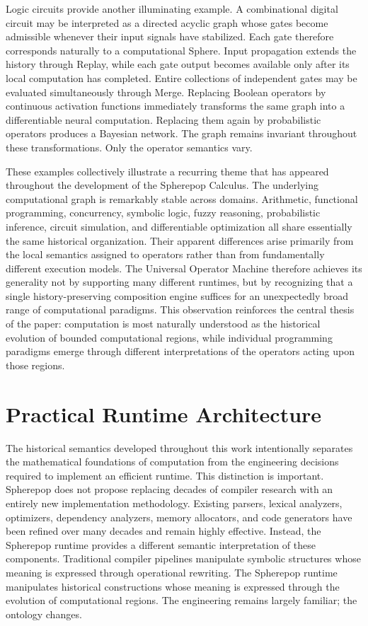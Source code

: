 \documentclass[12pt,oneside]{article}
\theoremstyle{definition}
\theoremstyle{remark}
\begin{document}
Logic circuits provide another illuminating example. A combinational digital
circuit may be interpreted as a directed acyclic graph whose gates become
admissible whenever their input signals have stabilized. Each gate therefore
corresponds naturally to a computational Sphere. Input propagation extends the
history through Replay, while each gate output becomes available only after
its local computation has completed. Entire collections of independent gates
may be evaluated simultaneously through Merge. Replacing Boolean operators by
continuous activation functions immediately transforms the same graph into a
differentiable neural computation. Replacing them again by probabilistic
operators produces a Bayesian network. The graph remains invariant throughout
these transformations. Only the operator semantics vary.

These examples collectively illustrate a recurring theme that has appeared
throughout the development of the Spherepop Calculus. The underlying
computational graph is remarkably stable across domains. Arithmetic,
functional programming, concurrency, symbolic logic, fuzzy reasoning,
probabilistic inference, circuit simulation, and differentiable optimization
all share essentially the same historical organization. Their apparent
differences arise primarily from the local semantics assigned to operators
rather than from fundamentally different execution models. The Universal
Operator Machine therefore achieves its generality not by supporting many
different runtimes, but by recognizing that a single history-preserving
composition engine suffices for an unexpectedly broad range of computational
paradigms. This observation reinforces the central thesis of the paper:
computation is most naturally understood as the historical evolution of
bounded computational regions, while individual programming paradigms emerge
through different interpretations of the operators acting upon those regions.

\section{Practical Runtime Architecture}

The historical semantics developed throughout this work intentionally separates
the mathematical foundations of computation from the engineering decisions
required to implement an efficient runtime. This distinction is important.
Spherepop does not propose replacing decades of compiler research with an
entirely new implementation methodology. Existing parsers, lexical analyzers,
optimizers, dependency analyzers, memory allocators, and code generators have
been refined over many decades and remain highly effective. Instead, the
Spherepop runtime provides a different semantic interpretation of these
components. Traditional compiler pipelines manipulate symbolic structures
whose meaning is expressed through operational rewriting. The Spherepop
runtime manipulates historical constructions whose meaning is expressed through
the evolution of computational regions. The engineering remains largely
familiar; the ontology changes.
\end{document}
